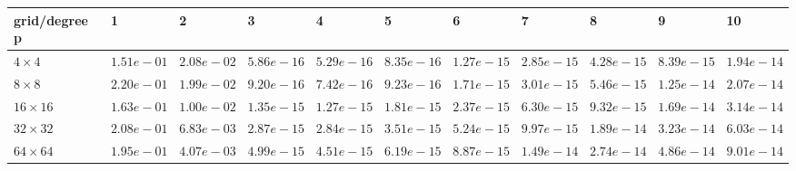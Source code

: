 \begin{tabular}{lllllllllll}
\hline
 grid/degree p   & 1          & 2          & 3          & 4          & 5          & 6          & 7          & 8          & 9          & 10         \\
\hline
 $4 \times 4$    & $1.51e-01$ & $2.08e-02$ & $5.86e-16$ & $5.29e-16$ & $8.35e-16$ & $1.27e-15$ & $2.85e-15$ & $4.28e-15$ & $8.39e-15$ & $1.94e-14$ \\
 $8 \times 8$    & $2.20e-01$ & $1.99e-02$ & $9.20e-16$ & $7.42e-16$ & $9.23e-16$ & $1.71e-15$ & $3.01e-15$ & $5.46e-15$ & $1.25e-14$ & $2.07e-14$ \\
 $16 \times 16$  & $1.63e-01$ & $1.00e-02$ & $1.35e-15$ & $1.27e-15$ & $1.81e-15$ & $2.37e-15$ & $6.30e-15$ & $9.32e-15$ & $1.69e-14$ & $3.14e-14$ \\
 $32 \times 32$  & $2.08e-01$ & $6.83e-03$ & $2.87e-15$ & $2.84e-15$ & $3.51e-15$ & $5.24e-15$ & $9.97e-15$ & $1.89e-14$ & $3.23e-14$ & $6.03e-14$ \\
 $64 \times 64$  & $1.95e-01$ & $4.07e-03$ & $4.99e-15$ & $4.51e-15$ & $6.19e-15$ & $8.87e-15$ & $1.49e-14$ & $2.74e-14$ & $4.86e-14$ & $9.01e-14$ \\
\hline
\end{tabular}